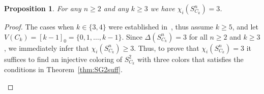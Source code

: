 \documentclass{article}
\newtheorem{proposition}[theorem]{Proposition}
\begin{document}
\begin{proposition}
For any $n\ge 2$ and any $k\ge 3$ we have $\chi_i(S_{C_k}^n) = 3$.
\end{proposition}
\begin{proof}
The cases when $k\in\{3,4\}$ were established in~\cite{bksy}, thus assume $k\ge 5$, and let $V(C_k)=[k-1]_0=\{0,1,\ldots, k-1\}$. Since $\Delta(S_{C_k}^n)=3$ for all $n\ge 2$ and $k\ge 3$, we immediately infer that $\chi_i(S_{C_k}^n)\ge 3$. Thus, to prove that $\chi_i(S_{C_k}^n) = 3$ it suffices to find an injective coloring of $S_{C_k}^2$ with three colors that satisfies the conditions in Theorem~\ref{thm:SG2suff}. 


\begin{figure}[H]
    \centering
\end{figure}
\end{proof}
\end{document}

